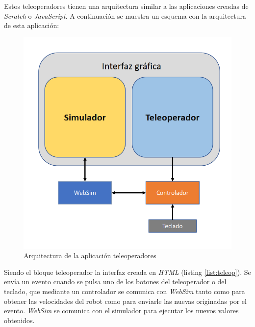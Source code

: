 Estos teleoperadores tienen una arquitectura similar a las aplicaciones creadas de \textit{Scratch} o \textit{JavaScript}. A continuación se muestra un esquema con la arquitectura de esta aplicación:

\begin{figure}[H]
    \centering            \includegraphics[scale=0.5]{img/arquitecturaTeleoperador.png}
    \caption{Arquitectura de la aplicación teleoperadores} 
    \label{fig:arq_teleop}
\end{figure}

Siendo el bloque teleoperador la interfaz creada en \textit{HTML} (listing \ref{list:teleop}). Se envía un evento cuando se pulsa uno de los botones del teleoperador o del teclado, que mediante un controlador se comunica con \textit{WebSim} tanto como para obtener las velocidades del robot como para enviarle las nuevas originadas por el evento. \textit{WebSim} se comunica con el simulador para ejecutar los nuevos valores obtenidos.

